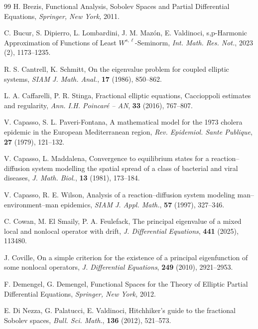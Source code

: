 \documentclass[a4paper,11pt]{amsart}
\theoremstyle{definition}
\numberwithin{equation}{section}
\theoremstyle{definition}
\begin{document}
\begin{thebibliography}{99}
H. Brezis, 
Functional Analysis, Sobolev Spaces and Partial Differential Equations, 
\textit{Springer, New York,} 2011.

C. Bucur, S. Dipierro, L. Lombardini, J. M. Mazón, E. Valdinoci, 
s,p-Harmonic Approximation of Functions of Least \(W^{s,\ell}\)-Seminorm, 
\textit{Int. Math. Res. Not.}, 2023 (2), 1173--1235. 



R. S. Cantrell, K. Schmitt, 
On the eigenvalue problem for coupled elliptic systems, 
\textit{SIAM J. Math. Anal.}, \textbf{17} (1986), 850--862.


L. A. Caffarelli, P. R. Stinga, 
Fractional elliptic equations, Caccioppoli estimates and regularity, 
\textit{Ann. I.H. Poincaré – AN}, \textbf{33} (2016), 767--807.

V. Capasso, S. L. Paveri-Fontana, 
A mathematical model for the 1973 cholera epidemic in the European Mediterranean region, 
\textit{Rev. Epidemiol. Sante Publique}, \textbf{27} (1979), 121--132.

V. Capasso, L. Maddalena, 
Convergence to equilibrium states for a reaction--diffusion system modelling the spatial spread of a class of bacterial and viral diseases, 
\textit{J. Math. Biol.}, \textbf{13} (1981), 173--184.

V. Capasso, R. E. Wilson, 
Analysis of a reaction--diffusion system modeling man--environment--man epidemics, 
\textit{SIAM J. Appl. Math.}, \textbf{57} (1997), 327--346.

C. Cowan, M. El Smaily, P. A. Feulefack, 
The principal eigenvalue of a mixed local and nonlocal operator with drift, 
\textit{J. Differential Equations}, \textbf{441} (2025), 113480. 


J. Coville, 
On a simple criterion for the existence of a principal eigenfunction of some nonlocal operators, 
\textit{J. Differential Equations}, \textbf{249} (2010), 2921--2953.


F. Demengel, G. Demengel, 
Functional Spaces for the Theory of Elliptic Partial Differential Equations, 
\textit{Springer, New York,} 2012.

E. Di Nezza, G. Palatucci, E. Valdinoci, 
Hitchhiker's guide to the fractional Sobolev spaces, 
\textit{Bull. Sci. Math.}, \textbf{136} (2012), 521--573.


\end{thebibliography}
\end{document}

